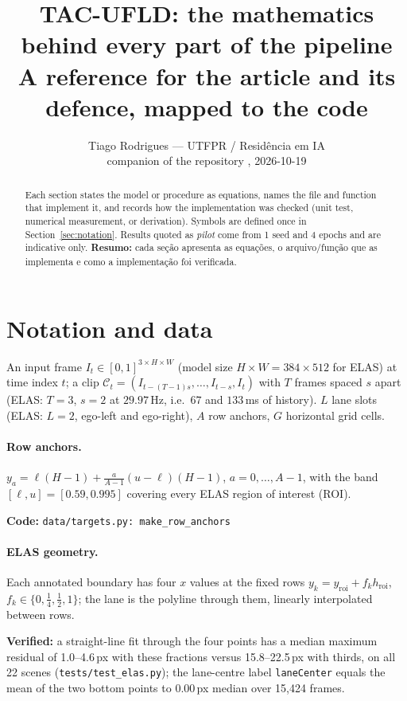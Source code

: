 \documentclass[10pt,a4paper]{article}
\title{TAC-UFLD: the mathematics behind every part of the pipeline\\[2pt]
\large A reference for the article and its defence, mapped to the code}
\author{Tiago Rodrigues --- UTFPR / Resid\^encia em IA\\ \small companion of the repository \code{tac-ufld-lane-detection}, 2026-10-19}
\date{}
\newcommand{\code}[1]{\texttt{\small #1}}
\newcommand{\impl}[1]{\par\noindent\textcolor{blue!50!black}{\small\textbf{Code:} \texttt{#1}}\par}
\newcommand{\verif}[1]{\par\noindent\textcolor{green!35!black}{\small\textbf{Verified:} #1}\par}
\theoremstyle{definition}
\begin{document}
\maketitle

\begin{abstract}
Each section states the model or procedure as equations, names the file and function that implement it, and
records how the implementation was checked (unit test, numerical measurement, or derivation). Symbols are
defined once in Section~\ref{sec:notation}. Results quoted as \emph{pilot} come from 1 seed and 4 epochs and are
indicative only. \textbf{Resumo:} cada se\c{c}\~ao apresenta as equa\c{c}\~oes, o arquivo/fun\c{c}\~ao que as
implementa e como a implementa\c{c}\~ao foi verificada.
\end{abstract}

\tableofcontents

\section{Notation and data}\label{sec:notation}
An input frame $I_t\in[0,1]^{3\times H\times W}$ (model size $H{\times}W=384{\times}512$ for ELAS) at time
index $t$; a clip $\mathcal{C}_t=(I_{t-(T-1)s},\dots,I_{t-s},I_t)$ with $T$ frames spaced $s$ apart (ELAS:
$T=3$, $s=2$ at $29.97$\,Hz, i.e.\ $67$ and $133$\,ms of history). $L$ lane slots (ELAS: $L=2$, ego-left and
ego-right), $A$ row anchors, $G$ horizontal grid cells.

\paragraph{Row anchors.} $y_a=\ell(H-1)+\frac{a}{A-1}(u-\ell)(H-1)$, $a=0,\dots,A-1$, with the band
$[\ell,u]=[0.59,0.995]$ covering every ELAS region of interest (ROI).
\impl{data/targets.py: make\_row\_anchors}

\paragraph{ELAS geometry.} Each annotated boundary has four $x$ values at the fixed rows
$y_k=y_{\mathrm{roi}}+f_k h_{\mathrm{roi}}$, $f_k\in\{0,\tfrac14,\tfrac12,1\}$; the lane is the polyline through
them, linearly interpolated between rows.
\verif{a straight-line fit through the four points has a median maximum residual of 1.0--4.6\,px with these
fractions versus 15.8--22.5\,px with thirds, on all 22 scenes (\code{tests/test\_elas.py}); the lane-centre label
\code{laneCenter} equals the mean of the two bottom points to 0.00\,px median over 15{,}424 frames.}
\end{document}
